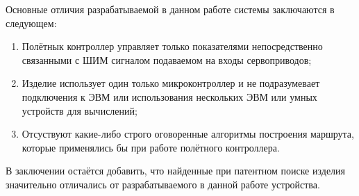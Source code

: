 Основные отличия разрабатываемой в данном работе системы заключаются в
следующем:
\begin{enumerate}
  
\item Полётнык контроллер управляет только показателями
непосредственно связанными с ШИМ сигналом подаваемом на входы
сервоприводов;
  
\item Изделие использует один только микроконтроллер и не
  подразумевает подключения к ЭВМ или использования нескольких ЭВМ или
умных устройств для вычислений;
  
\item Отсуствуют какие-либо строго оговоренные алгоритмы построения
маршрута, которые применялись бы при работе полётного контроллера.
\end{enumerate}

В заключении остаётся добавить, что найденные при патентном поиске
изделия значительно отличались от разрабатываемого в данной работе
устройства.



\newpage
